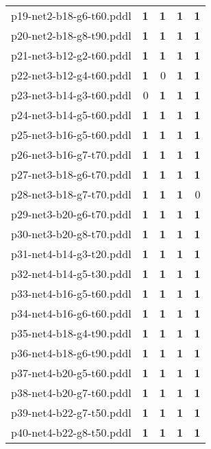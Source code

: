 \documentclass{article}
\begin{document}
\begin{tabular}{@{}lrrrr@{}}
p19-net2-b18-g6-t60.pddl & \textbf{1} & \textbf{1} & \textbf{1} & \textbf{1} \\
p20-net2-b18-g8-t90.pddl & \textbf{1} & \textbf{1} & \textbf{1} & \textbf{1} \\
p21-net3-b12-g2-t60.pddl & \textbf{1} & \textbf{1} & \textbf{1} & \textbf{1} \\
p22-net3-b12-g4-t60.pddl & \textbf{1} & 0 & \textbf{1} & \textbf{1} \\
p23-net3-b14-g3-t60.pddl & 0 & \textbf{1} & \textbf{1} & \textbf{1} \\
p24-net3-b14-g5-t60.pddl & \textbf{1} & \textbf{1} & \textbf{1} & \textbf{1} \\
p25-net3-b16-g5-t60.pddl & \textbf{1} & \textbf{1} & \textbf{1} & \textbf{1} \\
p26-net3-b16-g7-t70.pddl & \textbf{1} & \textbf{1} & \textbf{1} & \textbf{1} \\
p27-net3-b18-g6-t70.pddl & \textbf{1} & \textbf{1} & \textbf{1} & \textbf{1} \\
p28-net3-b18-g7-t70.pddl & \textbf{1} & \textbf{1} & \textbf{1} & 0 \\
p29-net3-b20-g6-t70.pddl & \textbf{1} & \textbf{1} & \textbf{1} & \textbf{1} \\
p30-net3-b20-g8-t70.pddl & \textbf{1} & \textbf{1} & \textbf{1} & \textbf{1} \\
p31-net4-b14-g3-t20.pddl & \textbf{1} & \textbf{1} & \textbf{1} & \textbf{1} \\
p32-net4-b14-g5-t30.pddl & \textbf{1} & \textbf{1} & \textbf{1} & \textbf{1} \\
p33-net4-b16-g5-t60.pddl & \textbf{1} & \textbf{1} & \textbf{1} & \textbf{1} \\
p34-net4-b16-g6-t60.pddl & \textbf{1} & \textbf{1} & \textbf{1} & \textbf{1} \\
p35-net4-b18-g4-t90.pddl & \textbf{1} & \textbf{1} & \textbf{1} & \textbf{1} \\
p36-net4-b18-g6-t90.pddl & \textbf{1} & \textbf{1} & \textbf{1} & \textbf{1} \\
p37-net4-b20-g5-t60.pddl & \textbf{1} & \textbf{1} & \textbf{1} & \textbf{1} \\
p38-net4-b20-g7-t60.pddl & \textbf{1} & \textbf{1} & \textbf{1} & \textbf{1} \\
p39-net4-b22-g7-t50.pddl & \textbf{1} & \textbf{1} & \textbf{1} & \textbf{1} \\
p40-net4-b22-g8-t50.pddl & \textbf{1} & \textbf{1} & \textbf{1} & \textbf{1} \\

\end{tabular}
\end{document}
